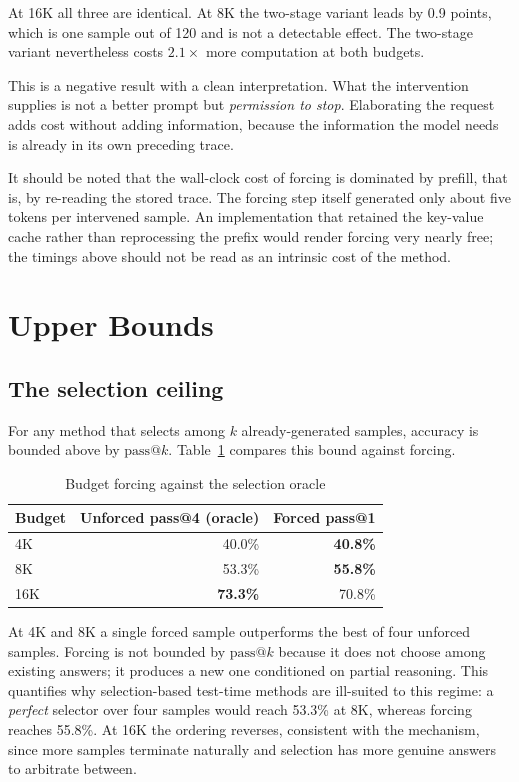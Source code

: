 \documentclass[12pt,a4paper,oneside]{report}
\begin{document}
At 16K all three are identical. At 8K the two-stage variant leads by 0.9 points,
which is one sample out of 120 and is not a detectable effect. The two-stage
variant nevertheless costs $2.1\times$ more computation at both budgets.

This is a negative result with a clean interpretation. What the intervention
supplies is not a better prompt but \emph{permission to stop}. Elaborating the
request adds cost without adding information, because the information the model
needs is already in its own preceding trace.

It should be noted that the wall-clock cost of forcing is dominated by prefill,
that is, by re-reading the stored trace. The forcing step itself generated only
about five tokens per intervened sample. An implementation that retained the
key-value cache rather than reprocessing the prefix would render forcing very
nearly free; the timings above should not be read as an intrinsic cost of the
method.

\section{Upper Bounds}

\subsection{The selection ceiling}

For any method that selects among $k$ already-generated samples, accuracy is
bounded above by $\text{pass}@k$. Table~\ref{tab:oracle} compares this bound
against forcing.

\begin{table}[htbp]
\centering
\caption{Budget forcing against the selection oracle}
\label{tab:oracle}
\small
\begin{tabular}{@{}lrr@{}}
\toprule
\textbf{Budget} & \textbf{Unforced pass@4 (oracle)} & \textbf{Forced pass@1} \\
\midrule
4K  & 40.0\% & \textbf{40.8\%} \\
8K  & 53.3\% & \textbf{55.8\%} \\
16K & \textbf{73.3\%} & 70.8\% \\
\bottomrule
\end{tabular}
\end{table}

At 4K and 8K a single forced sample outperforms the best of four unforced
samples. Forcing is not bounded by $\text{pass}@k$ because it does not choose
among existing answers; it produces a new one conditioned on partial reasoning.
This quantifies why selection-based test-time methods are ill-suited to this
regime: a \emph{perfect} selector over four samples would reach 53.3\% at 8K,
whereas forcing reaches 55.8\%. At 16K the ordering reverses, consistent with
the mechanism, since more samples terminate naturally and selection has more
genuine answers to arbitrate between.
\end{document}
